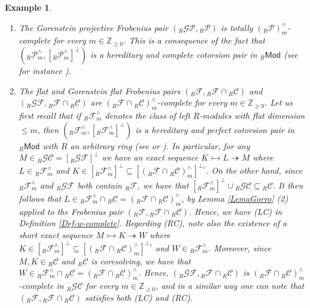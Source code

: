 \documentclass[10pt,reqno]{amsart}
\numberwithin{equation}{section}
\newtheorem{example}[definition]{Example}
\theoremstyle{remark}
\begin{document}
\begin{example}\label{ExGF} ~\
\begin{enumerate}[(1)]
\item The Gorenstein projective Frobenius pair $({}_R\mathcal{GP},{}_R\mathcal{P})$ is totally $({}_R\mathcal{P})^\wedge_m$-complete for every $m \in \mathbb{Z}_{\geq 0}$. This is a consequence of the fact that $({}_R\mathcal{P}^\wedge_m,[{}_R\mathcal{P}^\wedge_m]^{\perp})$ is a hereditary and complete cotorsion pair in ${}_R\mathsf{Mod}$ (see for instance \cite[Thm. 7.4.6]{EnJen00}).

\item The flat and Gorenstein flat Frobenius pairs $({}_R\mathcal{F},{}_R\mathcal{F} \cap {}_R\mathcal{C})$ and  $({}_R\mathcal{GF},{}_R\mathcal{F} \cap {}_R\mathcal{C})$ are $({}_R\mathcal{F} \cap {}_R\mathcal{C})^\wedge_m$-complete for every $m \in \mathbb{Z}_{\geq 0}$. Let us first recall that if ${}_R\mathcal{F}^{\wedge}_m$ denotes the class of left $R$-modules with flat dimension $\leq m$, then $({}_R\mathcal{F}^{\wedge}_m, [{}_R\mathcal{F}^\wedge_m]^{\perp})$ is a hereditary and perfect cotorsion pair in ${}_R\mathsf{Mod}$ with $R$ an arbitrary ring (see \cite[Thm. 3.4 (2)]{MaoDing} or \cite[Thm. 4.1.3]{GT06}). In particular, for any $M \in {}_R\mathcal{GC} = [{}_R\mathcal{GF}]^{\perp}$ we have an exact sequence $K \rightarrowtail L \twoheadrightarrow M$ where $L \in {}_R\mathcal{F}^{\wedge}_m$ and $K \in [{}_R\mathcal{F}^\wedge_m]^{\perp} \subseteq [({}_R\mathcal{F} \cap {}_R\mathcal{C})^\wedge_m]^{\perp_1}$. On the other hand, since ${}_R\mathcal{F}^{\wedge}_m$ and ${}_R\mathcal{GF}$ both contain ${}_R\mathcal{F}$, we have that $[{}_R\mathcal{F}^{\wedge}_m]^{\perp} \cup {}_R\mathcal{GC} \subseteq {}_R\mathcal{C}$. It then follows that $L \in {}_R\mathcal{F}^\wedge_m \cap {}_R\mathcal{C} = ({}_R\mathcal{F} \cap {}_R\mathcal{C})^\wedge_m$, by Lemma \ref{LemaGorro} (2) applied to the Frobenius pair $({}_R\mathcal{F}, {}_R\mathcal{F} \cap {}_R\mathcal{C})$. Hence, we have {\sf (LC)} in Definition \ref{Def-w-complete}. Regarding {\sf (RC)}, note also the existence of a short exact sequence $M \rightarrowtail K \twoheadrightarrow W$ where $K \in [{}_R\mathcal{F}^\wedge_m]^{\perp} \subseteq [({}_R\mathcal{F} \cap {}_R\mathcal{C})^\wedge_m]^{\perp_1}$ and $W \in {}_R\mathcal{F}^\wedge_m$. Moreover, since $M, K \in {}_R\mathcal{C}$ and ${}_R\mathcal{C}$ is coresolving, we have that $W \in {}_R\mathcal{F}^\wedge_m \cap {}_R\mathcal{C} = ({}_R\mathcal{F} \cap {}_R\mathcal{C})^\wedge_m$. Hence, $({}_R\mathcal{GF},{}_R\mathcal{F} \cap {}_R\mathcal{C})$ is $({}_R\mathcal{F} \cap {}_R\mathcal{C})^\wedge_m$-complete in ${}_R\mathcal{GC}$ for every $m \in \mathbb{Z}_{\geq 0}$, and in a similar way one can note that $({}_R\mathcal{F},{}_R\mathcal{F} \cap {}_R\mathcal{C})$ satisfies both {\sf (LC)} and {\sf (RC)}. 
\end{enumerate}
\end{example}
\end{document}
